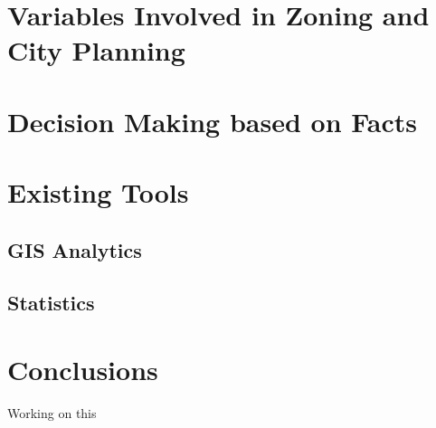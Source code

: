 \documentclass[sigconf]{acmart}
\begin{document}
\section{ Variables Involved in Zoning and City Planning}


\section{Decision Making based on Facts}




\section{Existing Tools}

\subsection{GIS Analytics}


\subsection{Statistics}



\section{Conclusions}

Working on this



\appendix



\begin{acks}

 
\end{acks}


 
\end{document}
